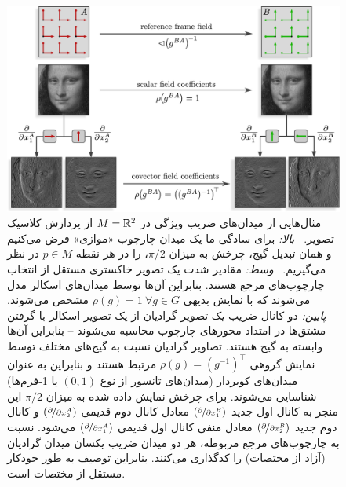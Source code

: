 		
		\begin{figure}
			\centering
			\includegraphics[width=.83\columnwidth]{figures/mona_lisa_gradient.pdf}
			\caption{\small
				مثال‌هایی از میدان‌های ضریب ویژگی در $M=\mathbb{R}^2$ از پردازش کلاسیک تصویر.
				\ \emph{بالا:}
				برای سادگی ما یک میدان چارچوب «موازی» فرض می‌کنیم و همان تبدیل گیج، چرخش به میزان $\pi/2$، را در هر نقطه $p\in M$ در نظر می‌گیریم.
				\ \emph{وسط:}
				مقادیر شدت یک تصویر خاکستری مستقل از انتخاب چارچوب‌های مرجع هستند.
				بنابراین آن‌ها توسط میدان‌های اسکالر مدل می‌شوند که با نمایش بدیهی $\rho(g)=1\ \forall g\in G$ مشخص می‌شوند.
				\ \emph{پایین:}
				دو کانال ضریب یک تصویر گرادیان از یک تصویر اسکالر با گرفتن مشتق‌ها در امتداد محورهای چارچوب محاسبه می‌شوند -- بنابراین آن‌ها وابسته به گیج هستند.
				تصاویر گرادیان نسبت به گیج‌های مختلف توسط نمایش گروهی $\rho(g)=(g^{-1})^\top$ مرتبط هستند و بنابراین به عنوان میدان‌های کوبردار (میدان‌های تانسور از نوع $(0,1)$ یا 1-فرم‌ها) شناسایی می‌شوند.
				برای چرخش نمایش داده شده به میزان $\pi/2$ این منجر به کانال اول جدید $(\nicefrac{\partial}{\partial x_1^B})$ معادل کانال دوم قدیمی $(\nicefrac{\partial}{\partial x_2^A})$ و کانال دوم جدید $(\nicefrac{\partial}{\partial x_2^B})$ معادل منفی کانال اول قدیمی $(\nicefrac{\partial}{\partial x_1^A})$ می‌شود.
				نسبت به چارچوب‌های مرجع مربوطه، هر دو میدان ضریب یکسان میدان گرادیان (آزاد از مختصات) را کدگذاری می‌کنند.
				بنابراین توصیف به طور خودکار مستقل از مختصات است.
			}
			\label{fig:feature_field_gradient}
		\end{figure}
				
